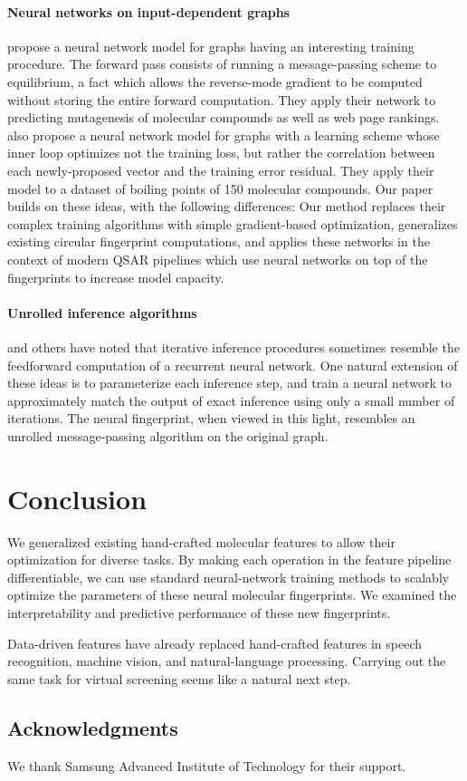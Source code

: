 \documentclass{article}
\begin{document}
\paragraph{Neural networks on input-dependent graphs}
\cite{graphnn2009} propose a neural network model for graphs having an interesting training procedure.
The forward pass consists of running a message-passing scheme to equilibrium, a fact which allows the reverse-mode gradient to be computed without storing the entire forward computation.
They apply their network to predicting mutagenesis of molecular compounds as well as web page rankings.
\cite{micheli2009neural} also propose a neural network model for graphs with a learning scheme whose inner loop optimizes not the training loss, but rather the correlation between each newly-proposed vector and the training error residual.
They apply their model to a dataset of boiling points of 150 molecular compounds.
Our paper builds on these ideas, with the following differences:
Our method replaces their complex training algorithms with simple gradient-based optimization, generalizes existing circular fingerprint computations, and applies these networks in the context of modern QSAR pipelines which use neural networks on top of the fingerprints to increase model capacity.

\paragraph{Unrolled inference algorithms}
\citet{hershey2014deep} and others have noted that iterative inference procedures sometimes resemble the feedforward computation of a recurrent neural network.
One natural extension of these ideas is to parameterize each inference step, and train a neural network to approximately match the output of exact inference using only a small number of iterations.
The neural fingerprint, when viewed in this light, resembles an unrolled message-passing algorithm on the original graph.


\section{Conclusion}
We generalized existing hand-crafted molecular features to allow their optimization for diverse tasks.
By making each operation in the feature pipeline differentiable, we can use standard neural-network training methods to scalably optimize the parameters of these neural molecular fingerprints.
We examined the interpretability and predictive performance of these new fingerprints.

Data-driven features have already replaced hand-crafted features in speech recognition, machine vision, and natural-language processing.
Carrying out the same task for virtual screening seems like a natural next step.

\subsection*{Acknowledgments}
We thank  Samsung Advanced Institute of Technology for their support.



\end{document}
